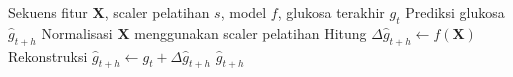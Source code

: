 \begin{algorithm}[!htbp]
    \caption{Prediksi dan Rekonstruksi Kadar Glukosa}
    \label{alg:alg5.2_prediksi_dan_rekonstruksi}
    \begin{algorithmic}[1]
        \Require Sekuens fitur $\mathbf{X}$, scaler pelatihan $s$, model $f$, glukosa terakhir $g_t$
        \Ensure Prediksi glukosa $\hat{g}_{t+h}$
        \State Normalisasi $\mathbf{X}$ menggunakan scaler pelatihan
        \State Hitung $\Delta\hat{g}_{t+h} \gets f(\mathbf{X})$
        \State Rekonstruksi $\hat{g}_{t+h} \gets g_t + \Delta\hat{g}_{t+h}$
        \State \Return $\hat{g}_{t+h}$
    \end{algorithmic}
\end{algorithm}
